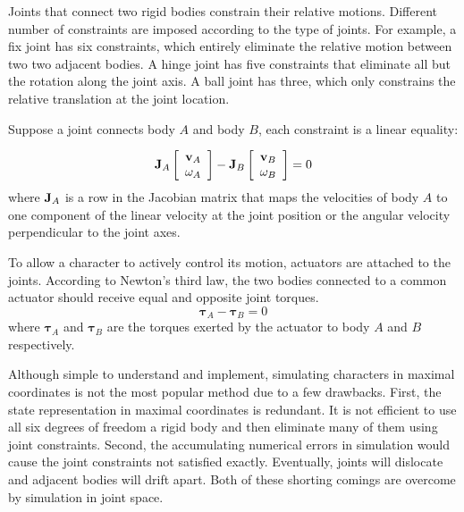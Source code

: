 Joints that connect two rigid bodies constrain their relative motions. Different number of constraints are imposed according to the type of joints. For example, a fix joint has six constraints, which entirely eliminate the relative motion between two two adjacent bodies. A hinge joint has five constraints that eliminate all but the rotation along the joint axis. A ball joint has three, which only constrains the relative translation at the joint location. 

Suppose a joint connects body $A$ and body $B$, each constraint is a linear equality:

\begin{equation}
\vc{J}_A
\left[\begin{array}{c}
\vc{v}_A \\
\vc{\omega}_A
\end{array}\right]-
\vc{J}_B
\left[\begin{array}{c}
\vc{v}_B \\
\vc{\omega}_B
\end{array}\right]
=0
\label{eq:jointConstraint}
\end{equation}
where $\mathbf{J}_A$ is a row in the Jacobian matrix that maps the velocities of body $A$ to one component of the linear velocity at the joint position or the angular velocity perpendicular to the joint axes.

To allow a character to actively control its motion, actuators are attached to the joints. According to Newton's third law, the two bodies connected to a common actuator should receive equal and opposite joint torques.
\begin{equation}
\boldsymbol{\tau}_A-\boldsymbol{\tau}_B=0
\label{eq:actuatorConstraint}
\end{equation}
where $\boldsymbol{\tau}_A$ and $\boldsymbol{\tau}_B$ are the torques exerted by the actuator to body $A$ and $B$ respectively.

Although simple to understand and implement, simulating characters in maximal coordinates is not the most popular method due to a few drawbacks. First, the state representation in  maximal coordinates is redundant. It is not efficient to use all six degrees of freedom a rigid body and then eliminate many of them using joint constraints. Second, the accumulating numerical errors in simulation would cause the joint constraints not satisfied exactly. Eventually, joints will dislocate and adjacent bodies will drift apart. Both of these shorting comings are overcome by simulation in joint space.

